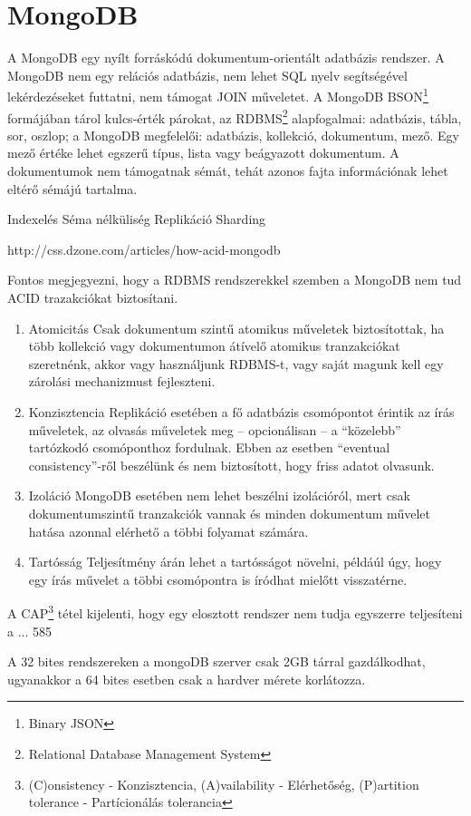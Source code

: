 \section{MongoDB}

A MongoDB egy nyílt forráskódú dokumentum-orientált adatbázis rendszer. A MongoDB nem egy relációs adatbázis, nem lehet SQL nyelv segítségével lekérdezéseket futtatni, nem támogat JOIN műveletet. A MongoDB BSON\footnote{Binary JSON} formájában tárol kulcs-érték párokat, az RDBMS\footnote{Relational Database Management System} alapfogalmai: adatbázis, tábla, sor, oszlop; a MongoDB megfelelői: adatbázis, kollekció, dokumentum, mező. Egy mező értéke lehet egszerű típus, lista vagy beágyazott dokumentum. A dokumentumok nem támogatnak sémát, tehát azonos fajta információnak lehet eltérő sémájú tartalma. 

Indexelés
Séma nélküliség
Replikáció
Sharding

http://css.dzone.com/articles/how-acid-mongodb

Fontos megjegyezni, hogy a RDBMS rendszerekkel szemben a MongoDB nem tud ACID trazakciókat biztosítani. 
\begin{enumerate}
\item{Atomicitás} Csak dokumentum szintű atomikus műveletek biztosítottak, ha több kollekció vagy dokumentumon átívelő atomikus tranzakciókat szeretnénk, akkor vagy használjunk RDBMS-t, vagy saját magunk kell egy zárolási mechanizmust fejleszteni.
\item{Konzisztencia} Replikáció esetében a fő adatbázis csomópontot érintik az írás műveletek, az olvasás műveletek meg -- opcionálisan --  a ``közelebb'' tartózkodó csomóponthoz fordulnak. Ebben az esetben ``eventual consistency''-ről beszélünk és nem biztosított, hogy friss adatot olvasunk.  
\item{Izoláció} MongoDB esetében nem lehet beszélni izolációról, mert csak dokumentumszintű tranzakciók vannak és minden dokumentum művelet hatása azonnal elérhető a többi folyamat számára. 
\item{Tartósság} Teljesítmény árán lehet a tartósságot növelni, példáúl úgy, hogy egy írás művelet a többi csomópontra is íródhat mielőtt visszatérne.
\end{enumerate}
A CAP\footnote{(C)onsistency - Konzisztencia, (A)vailability - Elérhetőség, (P)artition tolerance - Partícionálás tolerancia} tétel kijelenti, hogy egy elosztott rendszer nem tudja egyszerre teljesíteni a ...
585

A 32 bites rendszereken a mongoDB szerver csak 2GB tárral gazdálkodhat, ugyanakkor a 64 bites esetben csak a hardver mérete korlátozza.